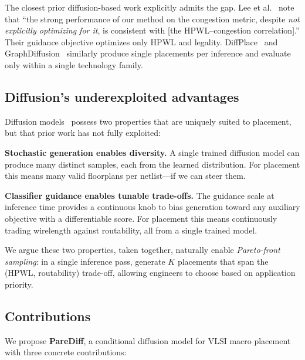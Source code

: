 The closest prior diffusion-based work explicitly admits the gap. Lee et al.~\cite{lee2024chipdiffusion} note that ``the strong performance of our method on the congestion metric, despite \emph{not explicitly optimizing for it}, is consistent with [the HPWL--congestion correlation].'' Their guidance objective optimizes only HPWL and legality. DiffPlace~\cite{trung2025diffplace} and GraphDiffusion~\cite{fang2025graphdiffusion} similarly produce single placements per inference and evaluate only within a single technology family.

\subsection{Diffusion's underexploited advantages}

Diffusion models~\cite{ho2020ddpm, song2021ddim} possess two properties that are uniquely suited to placement, but that prior work has not fully exploited:

\textbf{Stochastic generation enables diversity.} A single trained diffusion model can produce many distinct samples, each from the learned distribution. For placement this means many valid floorplans per netlist---if we can steer them.

\textbf{Classifier guidance enables tunable trade-offs.} The guidance scale at inference time provides a continuous knob to bias generation toward any auxiliary objective with a differentiable score. For placement this means continuously trading wirelength against routability, all from a single trained model.

We argue these two properties, taken together, naturally enable \emph{Pareto-front sampling}: in a single inference pass, generate $K$ placements that span the (HPWL, routability) trade-off, allowing engineers to choose based on application priority.

\subsection{Contributions}

We propose \textbf{PareDiff}, a conditional diffusion model for VLSI macro placement with three concrete contributions:

